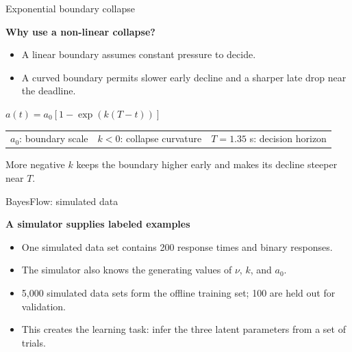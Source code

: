 \documentclass[aspectratio=43,10pt]{beamer}
\newcommand{\greenheading}[1]{%
  {\color{TUGreen}\fontsize{12}{14}\selectfont\bfseries #1\par}%
}
\begin{document}
\begin{frame}{Exponential boundary collapse}
  \vspace{0.17cm}
  \greenheading{Why use a non-linear collapse?}
  \begin{itemize}
    \item A linear boundary assumes constant pressure to decide.
    \item A curved boundary permits slower early decline and a sharper late drop near the deadline.
  \end{itemize}

  \vspace{0.35cm}
  \begin{center}
    {\fontsize{21}{25}\selectfont
      $a(t)=a_0\left[1-\exp\left(k(T-t)\right)\right]$}
  \end{center}

  \vspace{0.32cm}
  \begin{tabularx}{\textwidth}{>{\raggedright\arraybackslash}X >{\raggedright\arraybackslash}X >{\raggedright\arraybackslash}X}
    $a_0$: boundary scale & $k<0$: collapse curvature & $T=1.35$ s: decision horizon
  \end{tabularx}

  \vspace{0.30cm}
  {\color{TUMuted}\fontsize{9.8}{12}\selectfont
  More negative $k$ keeps the boundary higher early and makes its decline steeper near $T$.}
\end{frame}

\begin{frame}{BayesFlow: simulated data}
  \vspace{0.08cm}
  \greenheading{A simulator supplies labeled examples}
  \begin{itemize}
    \item One simulated data set contains 200 response times and binary responses.
    \item The simulator also knows the generating values of $\nu$, $k$, and $a_0$.
    \item 5,000 simulated data sets form the offline training set; 100 are held out for validation.
    \item This creates the learning task: infer the three latent parameters from a set of trials.
  \end{itemize}
\end{frame}
\end{document}
